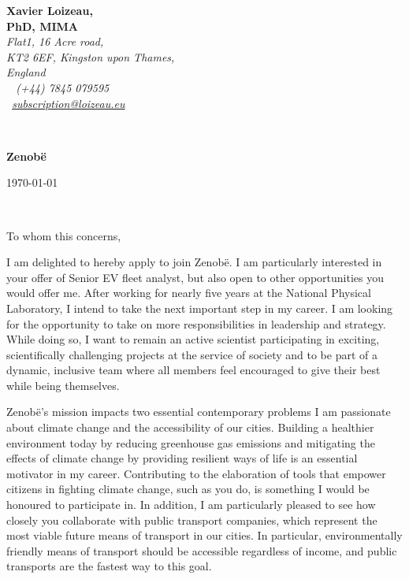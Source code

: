 \documentclass[12pt]{article}
\begin{document}
\sffamily   %
\hfill%
\begin{minipage}[t]{.6\textwidth}
\raggedleft%
{\bfseries Xavier Loizeau, \\ PhD, MIMA}\\[.35ex]
\small\itshape%
Flat1, 16 Acre road,\\
KT2 6EF, Kingston upon Thames,\\
England\\[.35ex]
\faMobile~ (+44) 7845 079595\\
\faAt~\href{mailto:subscription@loizeau.eu}{subscription@loizeau.eu}
\end{minipage}\\[1em]
%
\begin{minipage}[t]{.4\textwidth}
\raggedright%
{\bfseries Zenob\"e}\\
\end{minipage}
\hfill %
\begin{minipage}[t]{.4\textwidth}
\raggedleft %
\today
\end{minipage}\\
\raggedright

To whom this concerns,

I am delighted to hereby apply to join Zenob\"e.
I am particularly interested in your offer of Senior EV fleet analyst, but also open to other opportunities you would offer me.
After working for nearly five years at the National Physical Laboratory, I intend to take the next important step in my career.
I am looking for the opportunity to take on more responsibilities in leadership and strategy.
While doing so, I want to remain an active scientist participating in exciting, scientifically challenging projects at the service of society and to be part of a dynamic, inclusive team where all members feel encouraged to give their best while being themselves.

\medskip

Zenob\"e's mission impacts two essential contemporary problems I am passionate about climate change and the accessibility of our cities.
Building a healthier environment today by reducing greenhouse gas emissions and mitigating the effects of climate change by providing resilient ways of life is an essential motivator in my career.
Contributing to the elaboration of tools that empower citizens in fighting climate change, such as you do, is something I would be honoured to participate in.
In addition, I am particularly pleased to see how closely you collaborate with public transport companies, which represent the most viable future means of transport in our cities.
In particular, environmentally friendly means of transport should be accessible regardless of income, and public transports are the fastest way to this goal.
\end{document}
